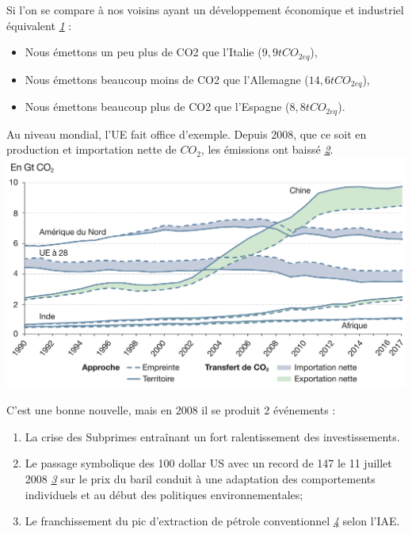 Si l'on se compare à nos voisins ayant un développement économique et
industriel équivalent
\emph{\href{https://bonpote.com/les-infographies-bon-pote/}{1}} :

\begin{itemize}
\tightlist
\item
  Nous émettons un peu plus de CO2 que l'Italie (\(9,9 tCO_{2eq}\)),
\item
  Nous émettons beaucoup moins de CO2 que l'Allemagne
  (\(14,6 tCO_{2eq}\)),
\item
  Nous émettons beaucoup plus de CO2 que l'Espagne (\(8,8 tCO_{2eq}\)).
\end{itemize}

Au niveau mondial, l'UE fait office d'exemple. Depuis 2008, que ce soit
en production et importation nette de \(CO_2\), les émissions ont baissé
\emph{\href{https://www.statistiques.developpement-durable.gouv.fr/edition-numerique/chiffres-cles-du-climat/5-empreinte-carbone-et-emissions-territoriales}{2}}.
\includegraphics{img/comparaison-internationale-emissions-CO2-CGDD.png}

C'est une bonne nouvelle, mais en 2008 il se produit 2 événements :

\begin{enumerate}
\def\labelenumi{\arabic{enumi}.}
\tightlist
\item
  La crise des Subprimes entraînant un fort ralentissement des
  investissements.
\item
  Le passage symbolique des 100 dollar US avec un record de 147 le 11
  juillet 2008
  \emph{\href{https://prixdubaril.com/comprendre-petrole-cours-industrie/68508-grandes-hausses-baisses-prix-petrole-1990-2020.html\#:~:text=En\%20janvier\%202008\%2C\%20le\%20baril,2008\%2C\%20d\%C3\%A9passant\%20les\%20147\%20dollars.}{3}}
  sur le prix du baril conduit à une adaptation des comportements
  individuels et au début des politiques environnementales;
\item
  Le franchissement du pic d'extraction de pétrole conventionnel
  \emph{\href{https://www.lemonde.fr/blog/petrole/2019/02/04/pic-petrolier-probable-dici-a-2025-selon-lagence-internationale-de-lenergie/}{4}}
  selon l'IAE.
\end{enumerate}

